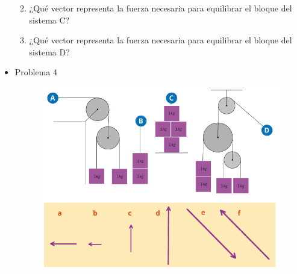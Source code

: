 \documentclass[11pt]{book}
\begin{document}
\begin{itemize}
\begin{boxK}
\begin{enumerate}
\begin{hoptboxes}
                  \end{hoptboxes}
            \item ¿Qué vector representa la fuerza necesaria para equilibrar el bloque
                  del sistema C?\\
            \item ¿Qué vector representa la fuerza necesaria para equilibrar el bloque
                  del sistema D?\\
          \end{enumerate}
        \end{boxK}
        \newpage
  \item Problema 4
        \begin{boxK}
          \begin{figure}[H]
            \centering
            \includegraphics[width=0.9\linewidth]{poleas03.png}

\end{figure}
\end{boxK}
\end{itemize}
\end{document}
